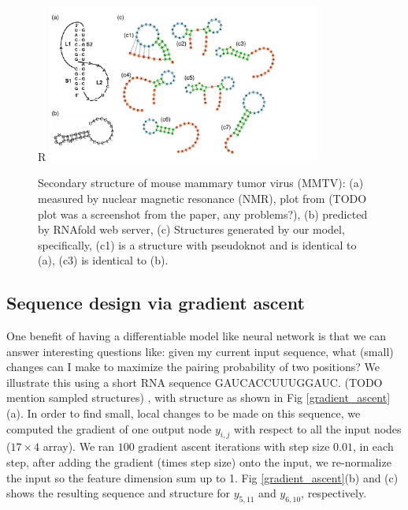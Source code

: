 \documentclass{article}
\begin{document}
\begin{figure}{R}
    \centering
    \includegraphics[width=0.8\textwidth]{plot/sample_structure_pseudoknot.pdf}
    \caption{Secondary structure of mouse mammary tumor virus (MMTV): (a) measured by nuclear magnetic resonance (NMR), plot from \cite{staple2005pseudoknots} (TODO plot was a screenshot from the paper, any problems?), (b) predicted by RNAfold web server, (c) Structures generated by our model, specifically, (c1) is a structure with pseudoknot and is identical to (a), (c3) is identical to (b).}
    \label{fig:sample_structure_pseudoknot}
    \centering
\end{figure}



%
%

\subsection{Sequence design via gradient ascent}

One benefit of having a differentiable model like neural network is that we can answer interesting questions like:
given my current input sequence, what (small) changes can I make to maximize the pairing probability of two positions?
We illustrate this using a short RNA sequence GAUCACCUUUGGAUC.
(TODO mention sampled structures)
, with structure as shown in Fig \ref{gradient_ascent}(a).
In order to find small, local changes to be made on this sequence,
we computed the gradient of one output node $y_{i, j}$
with respect to all the input nodes ($17 \times 4$ array).
We ran $100$ gradient ascent iterations with step size $0.01$,
in each step, after adding the gradient (times step size) onto the input,
we re-normalize the input so the feature dimension sum up to 1.
Fig \ref{gradient_ascent}(b) and (c) shows the resulting sequence and structure
for $y_{5, 11}$ and $y_{6, 10}$, respectively.
\end{document}
